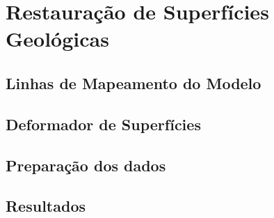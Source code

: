 
\chapter{Restauração de Superfícies Geológicas}

\section{Linhas de Mapeamento do Modelo}

\section{Deformador de Superfícies}

\section{Preparação dos dados}

\section{Resultados}

